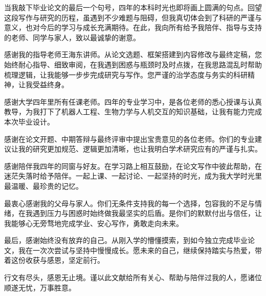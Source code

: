 \begin{acknowledgements}

当我敲下毕业论文的最后一个句号，四年的本科时光也即将画上圆满的句点。回望这段写作与研究的历程，虽遇到不少难题与阻碍，但我真切体会到了科研的严谨与意义，也对今后的学习与成长充满期待。在此，我向所有给予我陪伴、指导与支持的老师、同学与家人，致以最诚挚的谢意。

感谢我的指导老师王海东讲师。从论文选题、框架搭建到内容修改与最终定稿，您始终耐心指导、细致审阅，在我遇到困惑与瓶颈时及时点拨，在我思路混乱时帮助梳理逻辑，让我能够一步步完成研究与写作。您严谨的治学态度与务实的科研精神，让我受益终身。

感谢大学四年里所有任课老师。四年的专业学习中，是各位老师的悉心授课与认真教导，为我打下了机器人工程、生物力学与人机交互的知识基础，让我有能力完成本次毕业设计。

感谢在论文开题、中期答辩与最终评审中提出宝贵意见的各位老师。你们的专业建议让我的研究更加规范、逻辑更加清晰，也让我明白学术研究应有的严谨与扎实。

感谢陪伴我四年的同窗与好友。在学习路上相互鼓励，在论文写作中彼此帮助，在迷茫失落时给予陪伴。一起上课、一起讨论、一起坚持的时光，成为我大学时光里最温暖、最珍贵的记忆。

最衷心感谢我的父母与家人。你们无条件支持我的每一个选择，包容我的不足与情绪，在我遇到压力与困惑时始终做我最坚实的后盾。是你们的默默付出与信任，让我能够心无旁骛地完成学业、安心写作，勇敢走向未来。

最后，感谢始终没有放弃的自己。从刚入学的懵懂摸索，到如今独立完成毕业论文，我在一次次尝试与坚持中慢慢成长。愿未来的自己，继续保持踏实与热爱，带着这份收获与感恩，坚定前行。

行文有尽头，感恩无止境。谨以此文献给所有关心、帮助与陪伴过我的人，愿诸位顺遂无忧，万事胜意。

\end{acknowledgements}
